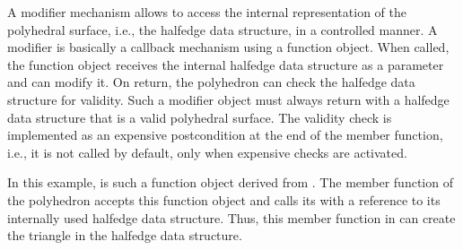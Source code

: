 A modifier mechanism allows to access the internal representation of
the polyhedral surface, i.e., the halfedge data structure, in a
controlled manner. A modifier is basically a callback mechanism using
a function object. When called, the function object receives the
internal halfedge data structure as a parameter and can modify it.  On
return, the polyhedron can check the halfedge data structure for
validity. Such a modifier object must always return with a halfedge
data structure that is a valid polyhedral surface. The validity check is
implemented as an expensive postcondition at the end of the 
member function, i.e., it is not called by default, only when expensive
checks are activated.

In this example,  is such a function object
derived from . The 
member function of the polyhedron accepts this function object and calls
its  with a reference to its internally used halfedge 
data structure. Thus, this member function in  can 
create the triangle in the halfedge data structure.






